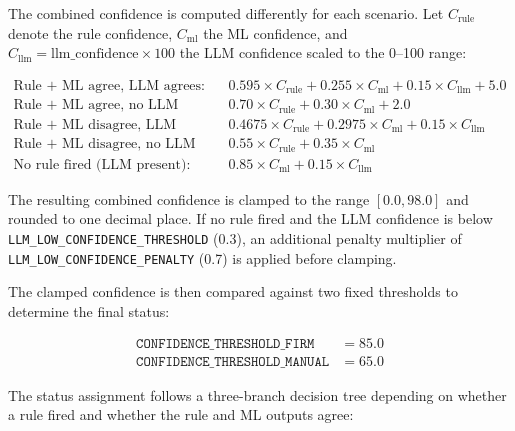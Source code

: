 \documentclass[10pt]{article}
\begin{document}
The combined confidence is computed differently for each scenario. Let \(C_{\text{rule}}\) denote the rule confidence, \(C_{\text{ml}}\) the ML confidence, and \(C_{\text{llm}} = \text{llm\_confidence} \times 100\) the LLM confidence scaled to the 0--100 range:

\begin{align}
\text{Rule + ML agree, LLM agrees:}\quad &
0.595 \times C_{\text{rule}} + 0.255 \times C_{\text{ml}} + 0.15 \times C_{\text{llm}} + 5.0 \\
\text{Rule + ML agree, no LLM signal:}\quad &
0.70 \times C_{\text{rule}} + 0.30 \times C_{\text{ml}} + 2.0 \\
\text{Rule + ML disagree, LLM agrees with either:}\quad &
0.4675 \times C_{\text{rule}} + 0.2975 \times C_{\text{ml}} + 0.15 \times C_{\text{llm}} \\
\text{Rule + ML disagree, no LLM signal:}\quad &
0.55 \times C_{\text{rule}} + 0.35 \times C_{\text{ml}} \\
\text{No rule fired (LLM present):}\quad &
0.85 \times C_{\text{ml}} + 0.15 \times C_{\text{llm}}
\end{align}

The resulting combined confidence is clamped to the range $[0.0, 98.0]$ and rounded to one decimal place. If no rule fired and the LLM confidence is below \texttt{LLM\_LOW\_CONFIDENCE\_THRESHOLD} (0.3), an additional penalty multiplier of \texttt{LLM\_LOW\_CONFIDENCE\_PENALTY} (0.7) is applied before clamping.

The clamped confidence is then compared against two fixed thresholds to determine the final status:

\begin{align}
\texttt{CONFIDENCE\_THRESHOLD\_FIRM} &= 85.0 \\
\texttt{CONFIDENCE\_THRESHOLD\_MANUAL} &= 65.0
\end{align}

The status assignment follows a three-branch decision tree depending on whether a rule fired and whether the rule and ML outputs agree:
\end{document}
